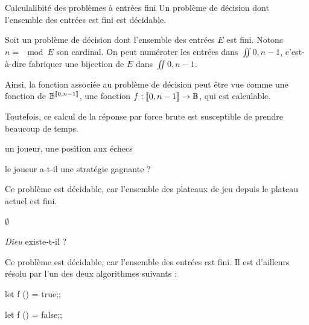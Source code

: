 \documentclass[a4paper,french,bookmarks]{book}
\begin{document}
    \begin{property}{Calculalibité des problèmes à entrées fini}{}
        Un problème de décision dont l'ensemble des entrées est fini est décidable.
    \end{property}
    \begin{nproof}
        Soit un problème de décision dont l'ensemble des entrées $E$ est fini. Notons $n = \mod{E}$ son cardinal. On peut numéroter les entrées dans $\iint{0, n-1}$, c'est-à-dire fabriquer une bijection de $E$ dans $\iint{0, n-1}$.
        
        Ainsi, la fonction associée au problème de décision peut être vue comme une fonction de $\mathbb{B}^{\left\llbracket0, n-1\right\rrbracket}$, \ie une fonction $f : \left\llbracket0, n-1\right\rrbracket \to \mathbb{B}$, qui est calculable.
    \end{nproof}
    
    Toutefois, ce calcul de la réponse par force brute est susceptible de prendre beaucoup de temps.
    
    \begin{example}{}{}
        \begin{enumerate}
            \itt{} un joueur, une position aux échecs
            
                 le joueur a-t-il une stratégie gagnante ?
                
                Ce problème est décidable, car l'ensemble des plateaux de jeu  depuis le plateau actuel est fini. 
        \end{enumerate}
        \begin{enumerate}
            \itt{} $\emptyset$
            
                 \emph{Dieu} existe-t-il ?
                
                Ce problème est décidable, car l'ensemble des entrées est fini. Il est d'ailleurs résolu par l'un des deux algorithmes suivants :
                
                \begin{minipage}{0.48\linewidth}
                    \begin{ocaml}
let f () = true;;
                    \end{ocaml}
                \end{minipage}
                \hfill
                \begin{minipage}{0.48\linewidth}
                    \begin{ocaml}
let f () = false;;
                    \end{ocaml}
                \end{minipage}
        \end{enumerate}
    \end{example}
    
\end{document}

